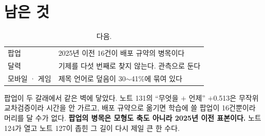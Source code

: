 \documentclass[10pt]{article}
\begin{document}
\section{남은 것}

\begin{table}[t]
\centering\tsize
\caption{다음.}
\begin{tabular}{ll}
\toprule
팝업 & 2025년 이전 16건이 배포 규약의 병목이다 \\
달력 & 기제를 다섯 번째로 찾지 않는다. 관측으로 둔다 \\
모바일 · 게임 & 제목 언어로 덮음이 30$\sim$41\%에 묶여 있다 \\
\bottomrule
\end{tabular}
\end{table}

팝업이 두 갈래에서 같은 벽에 닿았다. 노트 131의 ``무엇을 $+$ 언제''
$+$0.513은 무작위 교차검증이라 시간을 안 가르고, 배포 규약으로 옮기면
학습에 쓸 팝업이 16건뿐이라 머리를 달 수가 없다. \textbf{팝업의 병목은
모형도 축도 아니라 2025년 이전 표본이다.} 노트 124가 열고 노트 127이
좁힌 그 길이 다시 제일 큰 한 수다.
\end{document}
